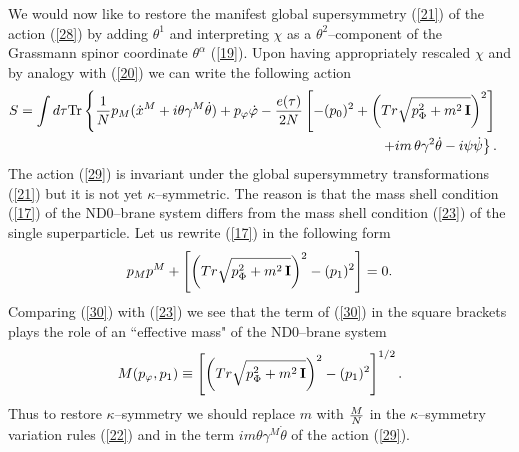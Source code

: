 \documentclass[a4paper,12pt]{article}
\newcommand{\nn}{\nonumber\\}\newcommand{\p}[1]{(\ref{#1})}
\begin{document}
We would now like to restore the manifest global supersymmetry
\p{21} of the action \p{28} by adding
$\theta^1$ and interpreting $\chi$ as a $\theta^2$--component of
the Grassmann spinor coordinate $\theta^\alpha$ \p{19}. Upon
having appropriately rescaled $\chi$ and by analogy with \p{20} we
can write the following action
\begin{eqnarray}\label{29}
S=\int d\tau {\rm Tr}\left\{{1\over N}p_M(\dot
x^M+i\theta\gamma^M\dot\theta)+p_\varphi\dot\varphi-{{e(\tau)}\over
2N}\left[-(p_0)^2+\left(Tr\sqrt{p_\Phi^2+m^2\,{\bf
I}}\right)^2\right]\right.&&\nn  \left.+i{m}\,
\theta\gamma^2\dot\theta-i\psi\dot\psi \right\}.&&
\end{eqnarray}
The action \p{29} is invariant under the global supersymmetry
transformations \p{21} but it is not yet $\kappa$--symmetric. The
reason is that the mass shell condition \p{17} of the ND0--brane
system differs from the mass shell condition \p{23} of the single
superparticle. Let us rewrite \p{17} in the following form
\begin{equation}\label{30}
p_Mp^M+\left[\left(Tr\sqrt{p_\Phi^2+m^2\,{\bf
I}}\right)^2-(p_1)^2\right]=0.
\end{equation}
Comparing \p{30} with \p{23} we see that the term of \p{30} in the
square brackets plays the role of an ``effective mass" of the
ND0--brane system
\begin{equation}\label{31}
M(p_\varphi,p_1)\equiv \left[\left(Tr\sqrt{p_\Phi^2+m^2\,{\bf
I}}\right)^2-(p_1)^2\right]^{1/2}.
\end{equation}
Thus to restore $\kappa$--symmetry we should replace $m$ with ${M\over N}$
in the $\kappa$--symmetry variation rules \p{22} and in the term
$i{m}\theta\gamma^M\dot\theta$ of the action \p{29}.
\end{document}
